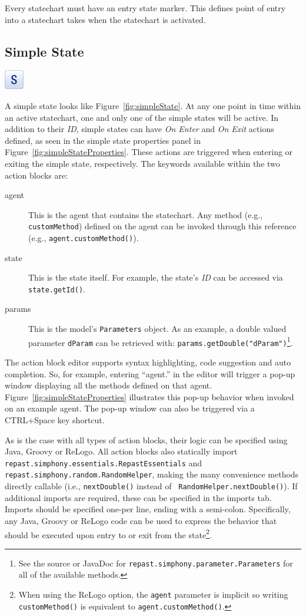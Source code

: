 \documentclass[11pt]{amsart}
\begin{document}
Every statechart must have an entry state marker. This defines point of entry into a statechart takes when the statechart is activated.

\subsection{Simple State}
\label{sec:simpleState}
\includegraphics[height=.2in]{StatechartsImages/State-32.png}

A simple state looks like Figure~\ref{fig:simpleState}. At any one point in time within an active statechart, one and only one of the simple states will be active. In addition to their \emph{ID}, simple states can have \emph{On Enter} and \emph{On Exit} actions defined, as seen in the simple state properties panel in Figure~\ref{fig:simpleStateProperties}. These actions are triggered when entering or exiting the simple state, respectively. The keywords available within the two action blocks are:
\begin{description}
\item[agent] This is the agent that contains the statechart. Any method (e.g., \texttt{customMethod}) defined on the agent can be invoked through this reference (e.g., \texttt{agent.customMethod()}).
\item[state] This is the state itself. For example, the state's \emph{ID} can be accessed via \texttt{state.getId()}.
\item[params] This is the model's \texttt{Parameters} object. As an example, a double valued parameter \texttt{dParam} can be retrieved with: \texttt{params.getDouble("dParam")}\footnote{See the source or JavaDoc for  \texttt{repast.simphony.parameter.Parameters} for all of the available methods.}.
\end{description}

The action block editor supports syntax highlighting, code suggestion and auto completion. So, for example, entering ``agent.'' in the editor will trigger a pop-up window displaying all the methods defined on that agent. Figure~\ref{fig:simpleStateProperties} illustrates this pop-up behavior when invoked on an example agent. The pop-up window can also be triggered via a CTRL+Space key shortcut. 

As is the case with all types of action blocks, their logic can be specified using Java, Groovy or ReLogo. All action blocks also statically import \texttt{repast.simphony.essentials.\-RepastEssentials} and \texttt{repast.simphony.random.RandomHelper}, making the many convenience methods directly callable (i.e., \texttt{nextDouble()} instead of \ \texttt{RandomHelper.nextDouble()}). If additional imports are required, these can be specified in the imports tab. Imports should be specified one-per line, ending with a semi-colon. Specifically, any Java, Groovy or ReLogo code can be used to express the behavior that should be executed upon entry to or exit from the state\footnote{When using the ReLogo option, the \texttt{agent} parameter is implicit so writing \texttt{customMethod()} is equivalent to \texttt{agent.customMethod()}.}.
\end{document}
